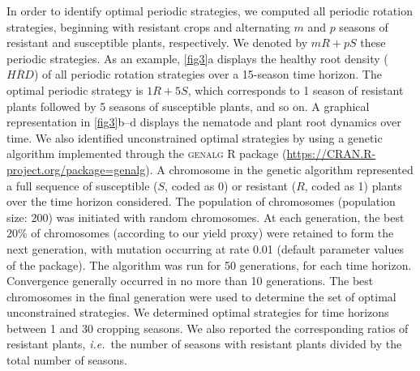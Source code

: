{{{{In order to identify optimal periodic strategies, we computed all
periodic rotation strategies, beginning with resistant crops and
alternating $m$ and $p$ seasons of resistant and susceptible plants,
respectively. We denoted by $mR+pS$ these periodic strategies. As an
example, \autoref{fig3}a displays the healthy root density
($\overline{HRD}$) of all periodic rotation strategies over a
15-season time horizon. The optimal periodic strategy is $1R+5S$,
which corresponds to 1 season of resistant plants followed by 5
seasons of susceptible plants, and so on. A graphical representation
in \autoref{fig3}b--d displays the nematode and plant root dynamics
over time. We also identified unconstrained optimal strategies by
using a genetic algorithm implemented through the \textsc{genalg} R
package
(\href{https://CRAN.R-project.org/package=genalg}{https://CRAN.R-project.org/package=genalg}).
A chromosome in the genetic algorithm represented a full sequence of
susceptible ($S$, coded as 0) or resistant ($R$, coded as 1) plants
over the time horizon considered.  The population of chromosomes
(population size: 200) was initiated with random chromosomes. At each
generation, the best $20\%$ of chromosomes (according to our yield
proxy) were retained to form the next generation, with mutation
occurring at rate 0.01 (default parameter values of the package). The
algorithm was run for 50 generations, for each time
horizon. Convergence generally occurred in no more than 10
generations. The best chromosomes in the final generation were used to
determine the set of optimal unconstrained strategies.  We determined
optimal strategies for time horizons between 1 and 30 cropping
seasons. We also reported the corresponding ratios of resistant
plants, \textit{i.e.}\ the number of seasons with resistant plants
divided by the total number of seasons.

}}}}
